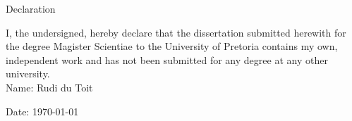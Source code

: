 \documentclass[main.tex]{subfiles}
\begin{document}
\newpage
\begin{center}
  {\Large Declaration}
\end{center}

I, the undersigned, hereby declare that the dissertation submitted herewith
for the degree Magister Scientiae to the University of Pretoria contains my
own, independent work and has not been submitted for any degree at any
other university.\\


Name: Rudi du Toit

Date: \today
\end{document}
